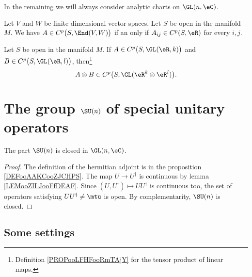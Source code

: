 In the remaining we will always consider analytic charts on \( \GL(n,\eC)\).

\begin{proposition}		\label{PROPooRRNXooXJZYSB}
	Let \( V\) and \( W\) be finite dimensional vector spaces. Let \( S\) be open in the manifold \( M\). We have \( A\in C^p\big( S,\End(V,W) \big) \) if an only if \( A_{ij}\in C^p(S,\eR)\) for every \( i,j\).
\end{proposition}
\noproof

\begin{proposition}		\label{PROPooLANVooKPiLuu}
	Let \( S\) be open in the manifold \( M\). If \( A\in C^{p}\big( S,\GL(\eR,k) \big)\) and \( B\in C^{p}\big( S,\GL(\eR,l) \big)\), then\footnote{Definition \ref{PROPooLFHFooRmTAjY} for the tensor product of linear maps.}
	\begin{equation}
		A\otimes B\in C^{p}\big( S,\GL(\eR^k\otimes \eR^l) \big).
	\end{equation}
\end{proposition}
\noproof

\section{The group \texorpdfstring{$ \SU(n)$}{SUn} of special unitary operators}

\begin{lemma}        \label{LEMooKFQOooBVtyoW}
	The part \( \SU(n)\) is closed in \( \GL(n,\eC)\).
\end{lemma}

\begin{proof}
	The definition of the hermitian adjoint is in the proposition \ref{DEFooAAKCooZJCHPS}. The map \( U\to U^{\dag}\) is continuous by lemma \ref{LEMooZILJooFfDEAF}. Since \( (U,U^{\dag})\mapsto UU^{\dag}\) is continuous too, the set of operators satisfying \( UU^{\dag}\neq\mtu\) is open. By complementarity, \( \SU(n)\) is closed.
\end{proof}

\subsection{Some settings}

